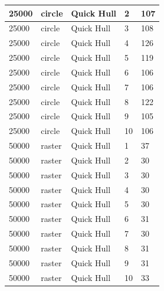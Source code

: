 \documentclass[12pt]{article}
\begin{document}
\begin{longtable}{|l|l|l|l|l|}
25000        & circle            & Quick Hull & 2          & 107                           \\ \hline
25000        & circle            & Quick Hull & 3          & 108                           \\ \hline
25000        & circle            & Quick Hull & 4          & 126                           \\ \hline
25000        & circle            & Quick Hull & 5          & 119                           \\ \hline
25000        & circle            & Quick Hull & 6          & 106                           \\ \hline
25000        & circle            & Quick Hull & 7          & 106                           \\ \hline
25000        & circle            & Quick Hull & 8          & 122                           \\ \hline
25000        & circle            & Quick Hull & 9          & 105                           \\ \hline
25000        & circle            & Quick Hull & 10         & 106                           \\ \hline
50000        & raster            & Quick Hull & 1          & 37                            \\ \hline
50000        & raster            & Quick Hull & 2          & 30                            \\ \hline
50000        & raster            & Quick Hull & 3          & 30                            \\ \hline
50000        & raster            & Quick Hull & 4          & 30                            \\ \hline
50000        & raster            & Quick Hull & 5          & 30                            \\ \hline
50000        & raster            & Quick Hull & 6          & 31                            \\ \hline
50000        & raster            & Quick Hull & 7          & 30                            \\ \hline
50000        & raster            & Quick Hull & 8          & 31                            \\ \hline
50000        & raster            & Quick Hull & 9          & 31                            \\ \hline
50000        & raster            & Quick Hull & 10         & 33                            \\ \hline

\end{longtable}
\end{document}

